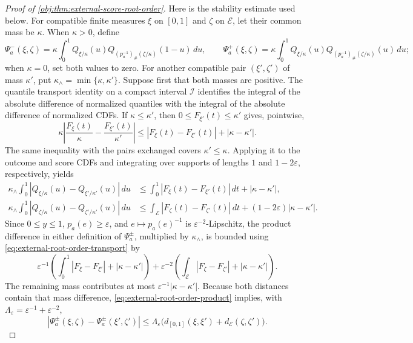 \begin{proof}[Proof of \cref{obj:thm:external-score-root-order}]
Here is the stability estimate used below. For compatible finite measures \(\xi\) on \([0,1]\) and \(\zeta\) on \(\mathcal E\), let their common mass be \(\kappa\). When \(\kappa>0\), define
\[
\Psi_a^-(\xi,\zeta)
=\kappa\int_0^1 Q_{\xi/\kappa}(u)
 Q_{(p_a^{-1})_\#(\zeta/\kappa)}(1-u)\,du,
\qquad
\Psi_a^+(\xi,\zeta)
=\kappa\int_0^1 Q_{\xi/\kappa}(u)
 Q_{(p_a^{-1})_\#(\zeta/\kappa)}(u)\,du;
\]
when \(\kappa=0\), set both values to zero. For another compatible pair \((\xi',\zeta')\) of mass \(\kappa'\), put \(\kappa_\wedge=\min\{\kappa,\kappa'\}\). Suppose first that both masses are positive. The quantile transport identity on a compact interval \(\mathcal I\) identifies the integral of the absolute difference of normalized quantiles with the integral of the absolute difference of normalized CDFs. If \(\kappa\leq\kappa'\), then \(0\leq F_{\xi'}(t)\leq\kappa'\) gives, pointwise,
\[
\kappa\left|\frac{F_\xi(t)}{\kappa}-\frac{F_{\xi'}(t)}{\kappa'}\right|
\leq |F_\xi(t)-F_{\xi'}(t)|+|\kappa-\kappa'|.
\]
The same inequality with the pairs exchanged covers \(\kappa'\leq\kappa\). Applying it to the outcome and score CDFs and integrating over supports of lengths \(1\) and \(1-2\varepsilon\), respectively, yields
\[
\begin{aligned}
\kappa_\wedge\int_0^1
 |Q_{\xi/\kappa}(u)-Q_{\xi'/\kappa'}(u)|\,du
&\leq
\int_0^1|F_\xi(t)-F_{\xi'}(t)|\,dt+|\kappa-\kappa'|,\\
\kappa_\wedge\int_0^1
 |Q_{\zeta/\kappa}(u)-Q_{\zeta'/\kappa'}(u)|\,du
&\leq
\int_{\mathcal E}|F_\zeta(t)-F_{\zeta'}(t)|\,dt
 +(1-2\varepsilon)|\kappa-\kappa'|.
\end{aligned} \label{eq:external-root-order-transport}
\]
Since \(0\leq y\leq1\), \(p_a(e)\geq\varepsilon\), and \(e\mapsto p_a(e)^{-1}\) is \(\varepsilon^{-2}\)-Lipschitz, the product difference in either definition of \(\Psi_a^\pm\), multiplied by \(\kappa_\wedge\), is bounded using \cref{eq:external-root-order-transport} by
\[
\varepsilon^{-1}
 \left(\int_0^1|F_\xi-F_{\xi'}|+|\kappa-\kappa'|\right)
+\varepsilon^{-2}
 \left(\int_{\mathcal E}|F_\zeta-F_{\zeta'}|
       +|\kappa-\kappa'|\right). \label{eq:external-root-order-product}
\]
The remaining mass contributes at most \(\varepsilon^{-1}|\kappa-\kappa'|\). Because both distances contain that mass difference, \cref{eq:external-root-order-product} implies, with
\(\Lambda_\varepsilon=\varepsilon^{-1}+\varepsilon^{-2}\),
\[
|\Psi_a^\pm(\xi,\zeta)-\Psi_a^\pm(\xi',\zeta')|
\leq
\Lambda_\varepsilon
 \bigl(d_{[0,1]}(\xi,\xi')+d_{\mathcal E}(\zeta,\zeta')\bigr). \label{eq:external-root-order-stability}
\]
\end{proof}
